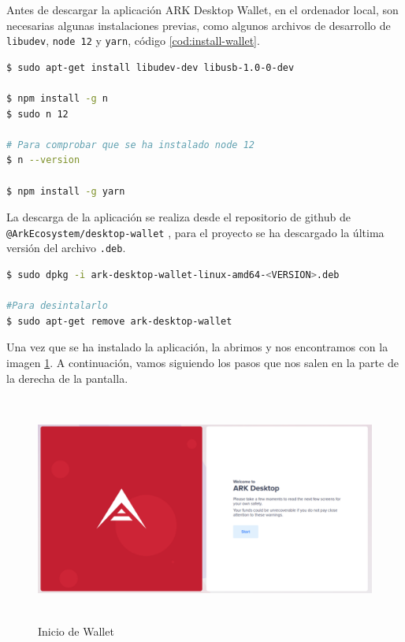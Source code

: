 Antes de descargar la aplicación ARK Desktop Wallet, en el ordenador local, son necesarias algunas instalaciones previas, como algunos archivos de desarrollo de \texttt{libudev}, \texttt{node 12} y \texttt{yarn}, código \ref{cod:install-wallet}.

\begin{lstlisting}[language=Bash,caption=Instalaciones previas a la aplicación ARK Wallet, label=cod:install-wallet, style=Consola]
$ sudo apt-get install libudev-dev libusb-1.0-0-dev

$ npm install -g n
$ sudo n 12

# Para comprobar que se ha instalado node 12
$ n --version

$ npm install -g yarn
\end{lstlisting}

La descarga de la aplicación se realiza desde el repositorio de github de \texttt{@ArkEcosystem/desktop-wallet} \cite{descargas-wallet}, para el proyecto se ha descargado la última versión del archivo \texttt{.deb}.

\begin{lstlisting}[language=Bash,caption=Instalación de la aplicación ARK Wallet, label=cod:install-wallet, style=Consola]
$ sudo dpkg -i ark-desktop-wallet-linux-amd64-<VERSION>.deb

#Para desintalarlo
$ sudo apt-get remove ark-desktop-wallet
\end{lstlisting}


Una vez que se ha instalado la aplicación, la abrimos y nos encontramos con la imagen \ref{fig:wallet-1}. A continuación, vamos siguiendo los pasos que nos salen en la parte de la derecha de la pantalla.

\begin{figure}[H]
	\centering
	\includegraphics[width=13.5cm,height=7.5cm]{figuras/wallet_1.png}
	\caption{Inicio de Wallet}
	\label{fig:wallet-1}
\end{figure}

